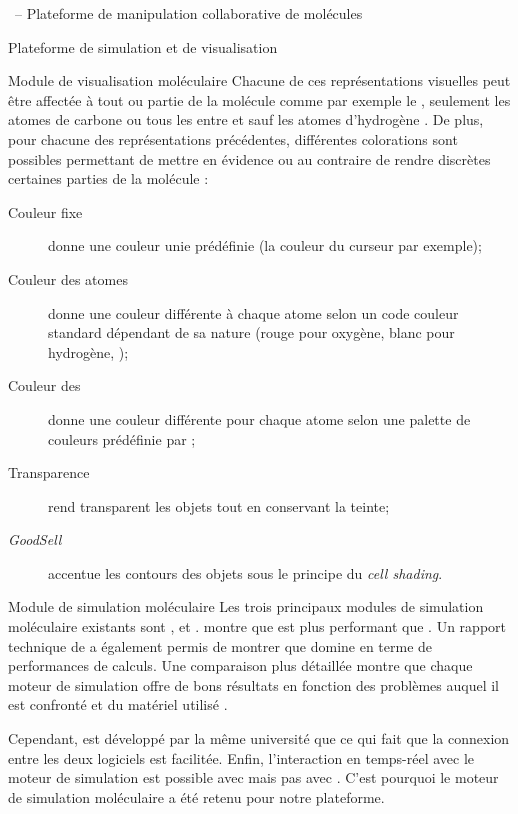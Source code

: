 \documentclass[myfrancais,ngerman,english,frenchb]{mythesis}
\begin{document}
\begin{mychapter}{\myShaddock\ -- Plateforme de manipulation collaborative de molécules}
\begin{mysection}{Plateforme de simulation et de visualisation}
\begin{mysubsection}{Module de visualisation moléculaire}
				Chacune de ces représentations visuelles peut être affectée à tout ou partie de la molécule comme par exemple \og le   \fg, \og seulement les atomes de carbone \fg ou \og tous les  entre  et  sauf les atomes d'hydrogène \fg.
				De plus, pour chacune des représentations précédentes, différentes colorations sont possibles permettant de mettre en évidence ou au contraire de rendre discrètes certaines parties de la molécule :
				\begin{description}
					\item[Couleur fixe] donne une couleur unie prédéfinie (la couleur du curseur par exemple);
					\item[Couleur des atomes] donne une couleur différente à chaque atome selon un code couleur standard dépendant de sa nature (rouge pour oxygène, blanc pour hydrogène, \myetc);
					\item[Couleur des ] donne une couleur différente pour chaque atome selon une palette de couleurs prédéfinie par ;
					\item[Transparence] rend transparent les objets tout en conservant la teinte;
					\item[\textit{GoodSell}] accentue les contours des objets sous le principe du \textit{cell shading}.
				\end{description}
			\end{mysubsection}
			\begin{mysubsection}{Module de simulation moléculaire}
				Les trois principaux modules de simulation moléculaire existants sont \myGromacs {},   et \myAMBER {}.
				 montre que \myGromacs est plus performant que .
				Un rapport technique de  a également permis de montrer que \myGromacs domine en terme de performances de calculs.
				Une comparaison plus détaillée montre que chaque moteur de simulation offre de bons résultats en fonction des problèmes auquel il est confronté et du matériel utilisé .

				Cependant,  est développé par la même université que  ce qui fait que la connexion entre les deux logiciels est facilitée.
				Enfin, l'interaction en temps-réel avec le moteur de simulation est possible avec  mais pas avec \myGromacs.
				C'est pourquoi le moteur de simulation moléculaire  a été retenu pour notre plateforme.


\end{mysubsection}
\end{mysection}
\end{mychapter}
\end{document}
